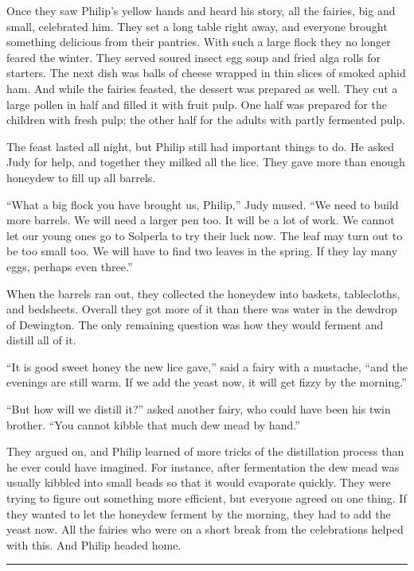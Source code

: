 \documentclass[10pt]{memoir}
\renewcommand{\pfbreakdisplay}{\bigskip \ding{166} \bigskip}
\newcommand{\secbreak}{\fancybreak{\pfbreakdisplay}}
\begin{document}
Once they saw Philip's yellow hands and heard his story, all the fairies, big
and small, celebrated him. They set a long table right away, and everyone
brought something delicious from their pantries. With such a large flock they
no longer feared the winter. They served soured insect egg soup and fried alga
rolls for starters. The next dish was balls of cheese wrapped in thin slices of
smoked aphid ham. And while the fairies feasted, the dessert was prepared as
well. They cut a large pollen in half and filled it with fruit pulp. One half
was prepared for the children with fresh pulp; the other half for the adults
with partly fermented pulp.

The feast lasted all night, but Philip still had important things to do. He
asked Judy for help, and together they milked all the lice. They gave more than
enough honeydew to fill up all barrels.

``What a big flock you have brought us, Philip,'' Judy mused. ``We need to
build more barrels. We will need a larger pen too. It will be a lot of work. We
cannot let our young ones go to Solperla to try their luck now. The leaf may
turn out to be too small too. We will have to find two leaves in the spring. If
they lay many eggs, perhaps even three.''

When the barrels ran out, they collected the honeydew into baskets,
tablecloths, and bedsheets. Overall they got more of it than there was water in
the dewdrop of Dewington. The only remaining question was how they would
ferment and distill all of it.

``It is good sweet honey the new lice gave,'' said a fairy with a mustache,
``and the evenings are still warm. If we add the yeast now, it will get fizzy
by the morning.''

``But how will we distill it?'' asked another fairy, who could have been his
twin brother. ``You cannot kibble that much dew mead by hand.''

They argued on, and Philip learned of more tricks of the distillation process
than he ever could have imagined. For instance, after fermentation the dew mead
was usually kibbled into small beads so that it would evaporate quickly. They
were trying to figure out something more efficient, but everyone agreed on one
thing. If they wanted to let the honeydew ferment by the morning, they had to
add the yeast now. All the fairies who were on a short break from the
celebrations helped with this. And Philip headed home.

\secbreak
\end{document}
